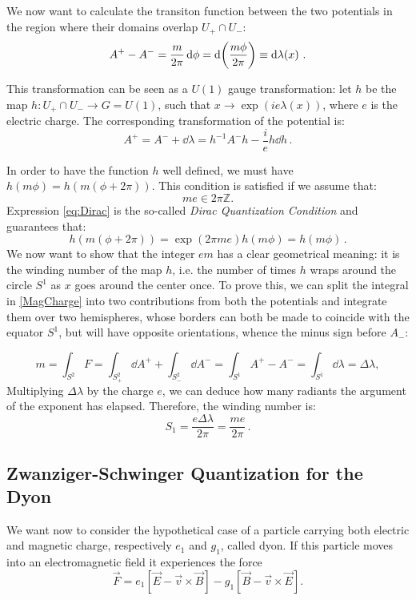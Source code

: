 \documentclass[main.tex]{subfiles}
\begin{document}
\medskip
We now want to calculate the transiton function between the two potentials in the region where their domains overlap $U_+ \cap U_-$:
\begin{equation}
A^+-A^-=\frac{m}{2\pi}\dd{\phi}=\dd{\qty(\frac{m\phi}{2\pi})} \equiv \dd{\lambda(x)}\,.
\end{equation}

This transformation can be seen as a $U(1)$ gauge transformation:
let $h$ be the map $h:U_+\cap U_- \to G=U(1)$, such that $x\to \exp(ie\lambda(x))$, where $e$ is the electric charge.
The corresponding transformation of the potential is:
%
\begin{equation}
A^+=A^-+\dd{\lambda}=h^{-1}A^-h-\frac{i}{e}h \dd{h}\,.
\end{equation}

In order to have  the function $h$ well defined, we must have $h(m\phi) = h(m(\phi+ 2\pi))$.
This condition is satisfied if we assume that: 
\begin{equation}
me \in 2\pi\mathbb{Z}.
\label{eq:Dirac}
\end{equation}
Expression  \eqref{eq:Dirac} is the so-called \textit{Dirac Quantization Condition} and guarantees that: 
\begin{equation}
h(m(\phi + 2\pi)) =  \exp(2 \pi me)  h(m\phi) = h( m \phi) \,.
\end{equation}
We now want to show that the integer $em$ has a clear geometrical meaning: it is the winding number of the map $h$, i.e. the number of times $h$ wraps around the circle $S^1$ as $x$ goes around the center once.
To prove this, we can split the integral in \eqref{MagCharge} into two contributions from both the potentials and integrate them over two hemispheres, whose borders can both be made to coincide with the equator $S^1$, but will have opposite orientations, whence the minus sign before $A_-$:

\begin{equation}
m=\int_{S^2}F=\int_{S^2_+}\dd{A}^++\int_{S^2_-}\dd{A}^-=\int_{S^1}A^+-A^-=\int_{S^1}\dd{\lambda}=\Delta\lambda,
\end{equation}
%
Multiplying $\Delta \lambda$ by the charge $e$, we can deduce how many radiants the argument of the exponent has elapsed. Therefore, the winding number is: 
\begin{equation}
S_1=\frac{e\Delta\lambda}{2\pi}=\frac{me}{2\pi} \,.
\end{equation}


\subsection{Zwanziger-Schwinger Quantization for the Dyon}
We want now to consider the hypothetical case of a particle carrying both electric and magnetic charge, respectively $e_1$ and $g_1$, called dyon. If this particle moves into an electromagnetic field it experiences the force
\begin{equation}
\vec F=e_1\left[\vec E-\vec v\times\vec B\right]-g_1\left[\vec B-\vec v\times\vec E\right].
\end{equation}
\end{document}

